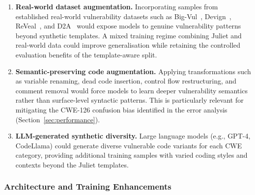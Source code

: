\begin{enumerate}
    \item \textbf{Real-world dataset augmentation.}
          Incorporating samples from established real-world vulnerability
          datasets such as Big-Vul~\cite{fan2020bigvul},
          Devign~\cite{zhou2019devign}, ReVeal~\cite{chakraborty2021reveal},
          and D2A~\cite{zheng2021d2a} would expose models to genuine
          vulnerability patterns beyond synthetic templates.  A mixed
          training regime combining Juliet and real-world data could
          improve generalisation while retaining the controlled evaluation
          benefits of the template-aware split.

    \item \textbf{Semantic-preserving code augmentation.}
          Applying transformations such as variable renaming, dead code
          insertion, control flow restructuring, and comment
          removal would force models to learn deeper vulnerability
          semantics rather than surface-level syntactic patterns.  This
          is particularly relevant for mitigating the CWE-126 confusion
          bias identified in the error analysis
          (Section~\ref{sec:performance}).

    \item \textbf{LLM-generated synthetic diversity.}
          Large language models (e.g., GPT-4, CodeLlama) could generate
          diverse vulnerable code variants for each CWE category, providing
          additional training samples with varied coding styles and contexts
          beyond the Juliet templates.
\end{enumerate}

\subsubsection{Architecture and Training Enhancements}

